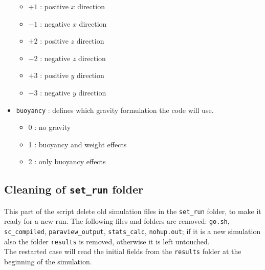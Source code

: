 \begin{itemize}
\begin{itemize}[label={$\circ$}]
\item $+1$ : positive $x$ direction
\item $-1$ : negative $x$ direction
\item $+2$ : positive $z$ direction
\item $-2$ : negative $z$ direction
\item $+3$ : positive $y$ direction
\item $-3$ : negative $y$ direction
\end{itemize}
\item \texttt{buoyancy} : defines which gravity formulation the code will use.
\begin{itemize}[label={$\circ$}]
\item 0 : no gravity
\item 1 : buoyancy and weight effects
\item 2 : only buoyancy effects
\end{itemize}
\end{itemize}

\subsection{Cleaning of \texttt{set\_run} folder}
\label{sec: restart}
This part of the script delete old simulation files in the \texttt{set\_run} folder, to make it ready for a new run. The following files and folders are removed: \texttt{go.sh}, \texttt{sc\_compiled}, \texttt{paraview\_output}, \texttt{stats\_calc}, \texttt{nohup.out}; if it is a new simulation also the folder \texttt{results} is removed, otherwise it is left untouched.\\
The restarted case will read the initial fields from the \texttt{results} folder at the beginning of the simulation.

